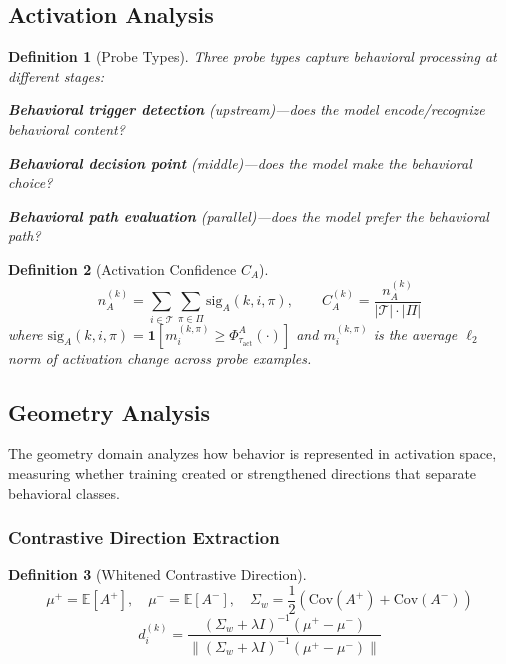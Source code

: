 \documentclass[11pt]{article}
\newtheorem{definition}{Definition}[section]
\begin{document}
\subsection{Activation Analysis}
\label{sec:activation}

\begin{definition}[Probe Types]
Three probe types capture behavioral processing at different stages:
\begin{description}[leftmargin=2em, nosep]
\item[$\pi_{\text{detect}}$:] \textbf{Behavioral trigger detection} (upstream)---does the model encode/recognize behavioral content?
\item[$\pi_{\text{decide}}$:] \textbf{Behavioral decision point} (middle)---does the model make the behavioral choice?
\item[$\pi_{\text{eval}}$:] \textbf{Behavioral path evaluation} (parallel)---does the model prefer the behavioral path?
\end{description}
\end{definition}

\begin{definition}[Activation Confidence $C_A$]
\begin{equation}
n^{(k)}_A = \sum_{i \in \mathcal{T}} \sum_{\pi \in \Pi} \text{sig}_A(k, i, \pi), \qquad C^{(k)}_A = \frac{n^{(k)}_A}{|\mathcal{T}| \cdot |\Pi|}
\end{equation}
where $\text{sig}_A(k, i, \pi) = \mathbf{1}[m^{(k,\pi)}_i \geq \Phi^A_{\tau_{\text{act}}}(\cdot)]$ and $m^{(k,\pi)}_i$ is the average $\ell_2$ norm of activation change across probe examples.
\end{definition}

\subsection{Geometry Analysis}
\label{sec:geometry}

The geometry domain analyzes how behavior is represented in activation space, measuring whether training created or strengthened directions that separate behavioral classes.

\subsubsection{Contrastive Direction Extraction}

\begin{definition}[Whitened Contrastive Direction]
\label{def:contrastive-direction}
\begin{equation}
\mu^+ = \mathbb{E}[A^+], \quad \mu^- = \mathbb{E}[A^-], \quad \Sigma_w = \frac{1}{2}\left(\text{Cov}(A^+) + \text{Cov}(A^-)\right)
\end{equation}
\begin{equation}
d^{(k)}_i = \frac{(\Sigma_w + \lambda I)^{-1}(\mu^+ - \mu^-)}{\|(\Sigma_w + \lambda I)^{-1}(\mu^+ - \mu^-)\|}
\end{equation}
\end{definition}
\end{document}
